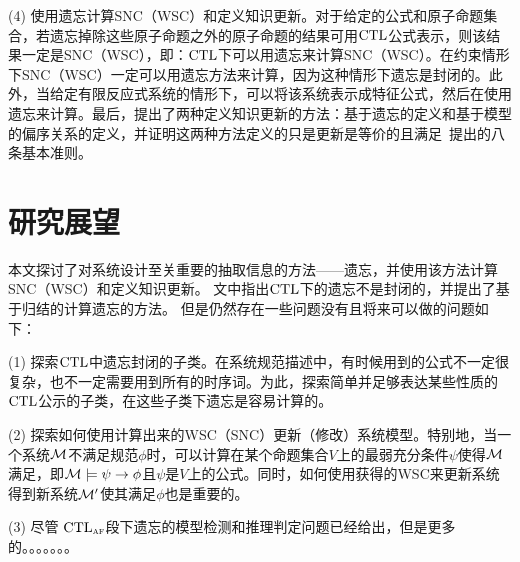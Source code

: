 (4) 使用遗忘计算SNC（WSC）和定义知识更新。对于给定的公式和原子命题集合，若遗忘掉除这些原子命题之外的原子命题的结果可用$\textrm{CTL}$公式表示，则该结果一定是SNC（WSC），即：$\textrm{CTL}$下可以用遗忘来计算SNC（WSC）。在约束情形下SNC（WSC）一定可以用遗忘方法来计算，因为这种情形下遗忘是封闭的。此外，当给定有限反应式系统的情形下，可以将该系统表示成特征公式，然后在使用遗忘来计算。最后，提出了两种定义知识更新的方法：基于遗忘的定义和基于模型的偏序关系的定义，并证明这两种方法定义的只是更新是等价的且满足~\citeauthor{katsuno91mendelzon}提出的八条基本准则。




\section{研究展望}
本文探讨了对系统设计至关重要的抽取信息的方法——遗忘，并使用该方法计算SNC（WSC）和定义知识更新。
文中指出$\textrm{CTL}$下的遗忘不是封闭的，并提出了基于归结的计算遗忘的方法。
但是仍然存在一些问题没有且将来可以做的问题如下：

(1) 探索$\textrm{CTL}$中遗忘封闭的子类。在系统规范描述中，有时候用到的公式不一定很复杂，也不一定需要用到所有的时序词。为此，探索简单并足够表达某些性质的$\textrm{CTL}$公示的子类，在这些子类下遗忘是容易计算的。

(2) 探索如何使用计算出来的WSC（SNC）更新（修改）系统模型。特别地，当一个系统$\cal M$不满足规范$\phi$时，可以计算在某个命题集合$V$上的最弱充分条件$\psi$使得${\cal M}$满足，即${\cal M}\models\psi\rightarrow \phi$且$\psi$是$V$上的公式。同时，如何使用获得的WSC来更新系统得到新系统${\cal M}'$使其满足$\phi$也是重要的。


(3) 尽管 $\textrm{CTL}_{\textsc{a}\textsc{f}}$段下遗忘的模型检测和推理判定问题已经给出，但是更多的。。。。。。。

